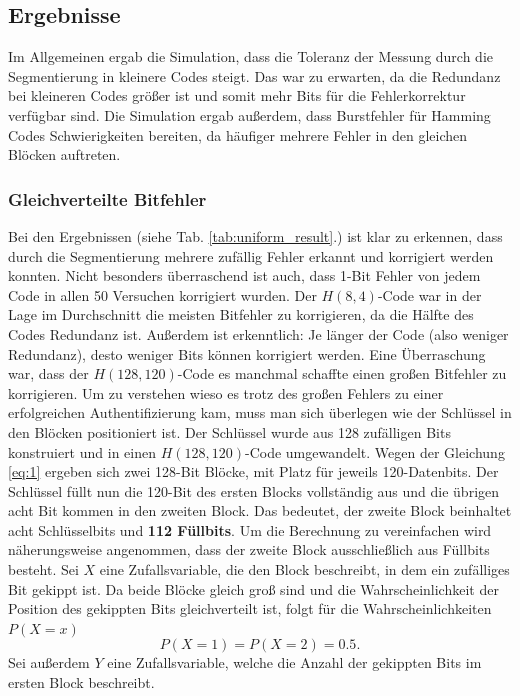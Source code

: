 \documentclass{article}
\begin{document}
    \subsection{Ergebnisse}
    Im Allgemeinen ergab die Simulation, dass die Toleranz der Messung durch die Segmentierung in kleinere Codes
    steigt. Das war zu erwarten, da die Redundanz bei kleineren Codes größer ist und somit mehr Bits für die
    Fehlerkorrektur verfügbar sind. Die Simulation ergab außerdem, dass Burstfehler für Hamming Codes Schwierigkeiten
    bereiten, da häufiger mehrere Fehler in den gleichen Blöcken auftreten.
    \subsubsection{Gleichverteilte Bitfehler}
    Bei den Ergebnissen (siehe Tab. \ref{tab:uniform_result}.) ist klar zu erkennen, dass durch die Segmentierung 
    mehrere zufällig Fehler erkannt und korrigiert werden konnten.
    Nicht besonders überraschend ist auch, dass 1-Bit Fehler von jedem Code in allen 50 Versuchen korrigiert 
    wurden. Der $H(8,4)$-Code war in der Lage im Durchschnitt die meisten Bitfehler zu korrigieren, da die
    Hälfte des Codes Redundanz ist. Außerdem ist erkenntlich: Je länger der Code (also weniger Redundanz), desto
    weniger Bits können korrigiert werden. Eine Überraschung war, dass der $H(128,120)$-Code es manchmal schaffte
    einen großen Bitfehler zu korrigieren. Um zu verstehen wieso es trotz des großen Fehlers zu einer erfolgreichen
    Authentifizierung kam, muss man sich überlegen wie der Schlüssel in den Blöcken positioniert ist.\newline
    Der Schlüssel wurde aus 128 zufälligen Bits konstruiert und in einen $H(128,120)$-Code umgewandelt.
    Wegen der Gleichung \ref{eq:1} ergeben sich zwei 128-Bit Blöcke, mit Platz für jeweils 120-Datenbits.
    Der Schlüssel füllt nun die 120-Bit des ersten Blocks vollständig aus und die übrigen acht Bit kommen
    in den zweiten Block. Das bedeutet, der zweite Block beinhaltet acht Schlüsselbits und \textbf{112 Füllbits}.
    Um die Berechnung zu vereinfachen wird näherungsweise angenommen, dass der zweite Block ausschließlich aus
    Füllbits besteht. Sei $X$ eine Zufallsvariable, die den Block beschreibt, in dem ein zufälliges Bit 
    gekippt ist. Da beide Blöcke gleich groß sind und die Wahrscheinlichkeit der Position des gekippten Bits
    gleichverteilt ist, folgt für die Wahrscheinlichkeiten $P(X=x)$
    \[
        P(X=1) = P(X=2) = 0.5.
    \]
    Sei außerdem $Y$ eine Zufallsvariable, welche die Anzahl der gekippten Bits im ersten Block beschreibt.
\end{document}
